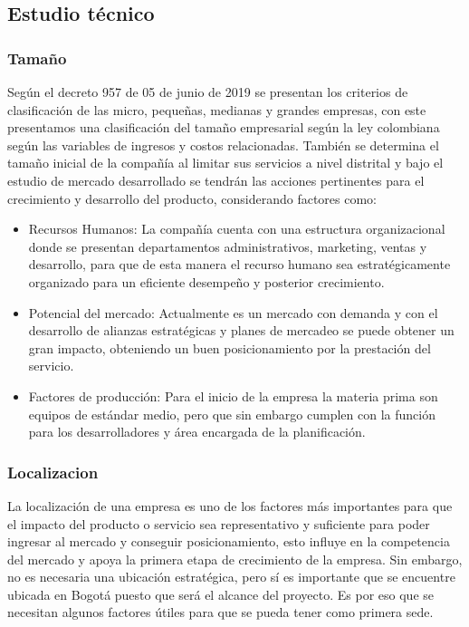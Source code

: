 \subsection{Estudio técnico}

\subsubsection*{Tamaño}
Según el decreto 957 de 05 de junio de 2019 se presentan los criterios de clasificación de las micro, pequeñas, medianas y grandes empresas, con este presentamos una clasificación del tamaño empresarial según la ley colombiana según las variables de ingresos y costos relacionadas. También se determina el tamaño inicial de la compañía al limitar sus servicios a nivel distrital y bajo el estudio de mercado desarrollado se tendrán las acciones pertinentes para el crecimiento y desarrollo del producto, considerando factores como:

\begin{itemize}
    \item Recursos Humanos: La compañía cuenta con una estructura organizacional donde se presentan departamentos administrativos, marketing, ventas y desarrollo, para que de esta manera el recurso humano sea estratégicamente organizado para un eficiente desempeño y posterior crecimiento.
    
    \item Potencial del mercado: Actualmente es un mercado con demanda y con el desarrollo de alianzas estratégicas y planes de mercadeo se puede obtener un gran impacto, obteniendo un buen posicionamiento por la prestación del servicio.
    
    \item Factores de producción: Para el inicio de la empresa la materia prima son equipos de estándar medio, pero que sin embargo cumplen con la función para los desarrolladores y área encargada de la planificación.
\end{itemize}


\subsubsection*{Localizacion}

La localización de una empresa es uno de los factores más importantes para que el impacto del producto o servicio sea representativo y suficiente para poder ingresar al mercado y conseguir posicionamiento, esto influye en la competencia del mercado y apoya la primera etapa de crecimiento de la empresa. Sin embargo, no es necesaria una ubicación estratégica, pero sí es importante que se encuentre ubicada en Bogotá puesto que será el alcance del proyecto. Es por eso que se necesitan algunos factores útiles para que se pueda tener como primera sede.

